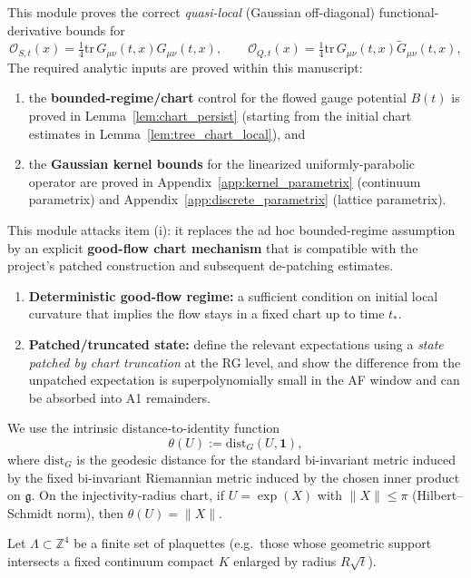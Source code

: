 This module proves the correct \emph{quasi-local} (Gaussian off-diagonal) functional-derivative bounds for
\[
\mathcal O_{S,t}(x)=\tfrac14\mathrm{tr}\,G_{\mu\nu}(t,x)G_{\mu\nu}(t,x),
\qquad
\mathcal O_{Q,t}(x)=\tfrac14\mathrm{tr}\,G_{\mu\nu}(t,x)\widetilde G_{\mu\nu}(t,x),
\]
The required analytic inputs are proved within this manuscript:
\begin{enumerate}[label=(\roman*)]
\item the \textbf{bounded-regime/chart} control for the flowed gauge potential $B(t)$ is proved in Lemma~\ref{lem:chart_persist}
(starting from the initial chart estimates in Lemma~\ref{lem:tree_chart_local}), and
\item the \textbf{Gaussian kernel bounds} for the linearized uniformly-parabolic operator are proved in Appendix~\ref{app:kernel_parametrix}
(continuum parametrix) and Appendix~\ref{app:discrete_parametrix} (lattice parametrix).
\end{enumerate}

This module attacks item (i): it replaces the ad hoc bounded-regime assumption by an explicit \textbf{good-flow chart mechanism}
that is compatible with the project's patched construction and subsequent de-patching estimates.

\begin{enumerate}[label=(A\arabic*)]
\item \textbf{Deterministic good-flow regime:} a sufficient condition on initial local curvature that implies the flow stays in a fixed chart up to time $t_\ast$.
\item \textbf{Patched/truncated state:} define the relevant expectations using a \emph{state patched by chart truncation} at the RG level,
and show the difference from the unpatched expectation is superpolynomially small in the AF window and can be absorbed into A1 remainders.
\end{enumerate}

We use the intrinsic distance-to-identity function
\[
\theta(U):=\mathrm{dist}_{G}(U,\mathbf 1),
\]
where $\mathrm{dist}_{G}$ is the geodesic distance for the standard bi-invariant metric induced by
the fixed bi-invariant Riemannian metric induced by the chosen inner product on $\mathfrak g$.
On the injectivity-radius chart, if $U=\exp(X)$ with $\|X\|\le \pi$ (Hilbert--Schmidt norm), then $\theta(U)=\|X\|$.


Let $\Lambda\subset\mathbb Z^4$ be a finite set of plaquettes (e.g.\ those whose geometric support intersects a fixed continuum compact $K$ enlarged by radius $R\sqrt t$).

